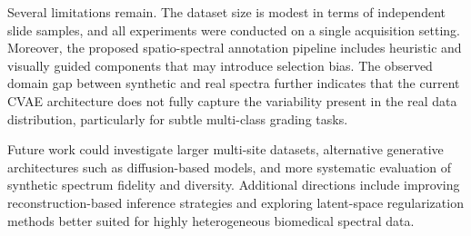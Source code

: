 Several limitations remain. The dataset size is modest in terms of independent slide samples, and all experiments were conducted on a single acquisition setting. Moreover, the proposed spatio-spectral annotation pipeline includes heuristic and visually guided components that may introduce selection bias. The observed domain gap between synthetic and real spectra further indicates that the current CVAE architecture does not fully capture the variability present in the real data distribution, particularly for subtle multi-class grading tasks.

Future work could investigate larger multi-site datasets, alternative generative architectures such as diffusion-based models, and more systematic evaluation of synthetic spectrum fidelity and diversity. Additional directions include improving reconstruction-based inference strategies and exploring latent-space regularization methods better suited for highly heterogeneous biomedical spectral data.
